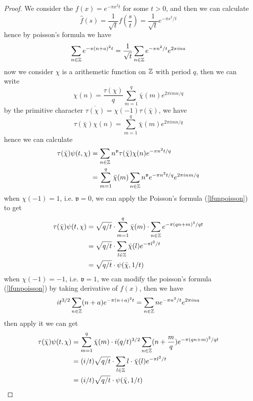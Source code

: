 \begin{proof}
    We consider the \(f(x) = e^{-\pi x^2t}\) for some \(t>0\), and then we can calculate \[\hat{f}(s) = \frac{1}{\sqrt{t}}f(\frac{s}{t}) = \frac{1}{\sqrt{t}}e^{-\pi s^2/t}\]
    hence by poisson's formula we have
    \begin{equation} \label{lfunpoisson}
        \sum_{n \in \mathbb{Z}}e^{-\pi (n+a)^2 t} = \frac{1}{\sqrt{t}} \sum_{n \in \mathbb{Z}}e^{-\pi n^2/t} e^{2\pi i n a}
    \end{equation}
    now we consider \(\chi\) is a arithemetic function on \(\mathbb{Z}\) with period \(q\), then we can write
    \[\chi(n) = \frac{\tau(\chi)}{q}\sum_{m=1}^{q}\bar{\chi}(m)e^{2\pi i mn/q}\]
    by the primitive character \(\overline{\tau(\chi)} = \chi(-1)\tau(\bar{\chi})\), we have
    \[\tau(\bar{\chi}) \chi(n) = \sum_{m=1}^{q}\bar{\chi}(m)e^{2\pi i mn/q}\]
    hence we can calculate
    \begin{align*}
        \tau(\bar{\chi})\psi(t,\chi) &= \sum_{n \in \mathbb{Z}}n^{\mathfrak{v}}\tau(\bar{\chi})\chi(n)e^{-\pi n^2 t/q} \\
        &= \sum_{m=1}^{q} \bar{\chi}(m) \sum_{n \in \mathbb{Z}} n^{\mathfrak{v}} e^{-\pi n^2 t/q}e^{2 \pi i n m/q} \\
    \end{align*}
    when \(\chi(-1) = 1\), i.e. \(\mathfrak{v} = 0\), we can apply the Poisson's formula (\ref{lfunpoisson}) to get 
    \begin{align*}
        \tau(\bar{\chi})\psi(t,\chi) &= \sqrt{q/t} \cdot \sum_{m=1}^{q} \bar{\chi}(m) \cdot \sum_{n \in \mathbb{Z}} e^{-\pi (qn+m)^2/q t} \\
        &= \sqrt{q/t} \cdot \sum_{l \in \mathbb{Z}} \bar{\chi}(l) e^{-\pi l^2/t} \\
        &= \sqrt{q/t} \cdot \psi(\bar{\chi},1/t)
    \end{align*}
    when \(\chi(-1) = -1\), i.e. \(\mathfrak{v} = 1\), we can modify the poisson's formula (\ref{lfunpoisson}) by taking derivative of \(f(x)\), then we have 
    \[it^{3/2}\sum_{n \in \mathbb{Z}}(n+a) e^{-\pi (n+a)^2 t} = \sum_{n \in \mathbb{Z}} n e^{-\pi n^2/t} e^{2\pi i n a}\]
    then apply it we can get
    \begin{align*}
        \tau(\bar{\chi})\psi(t,\chi) &= \sum_{m=1}^{q} \bar{\chi}(m) \cdot i(q/t)^{3/2} \sum_{n \in \mathbb{Z}} (n+\frac{m}{q}) e^{-\pi (qn+m)^2/qt} \\
        &= (i/t)\sqrt{q/t} \cdot \sum_{l \in \mathbb{Z}} l\cdot\bar{\chi}(l) e^{-\pi l^2/t} \\
        &= (i/t)\sqrt{q/t} \cdot \psi(\bar{\chi},1/t)
    \end{align*}
\end{proof}

